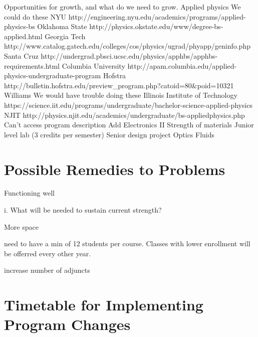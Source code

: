 \documentclass[12pt]{article}
\begin{document}
Opportunities for growth, and what do we need to grow.
Applied physics
We could do these
NYU http://engineering.nyu.edu/academics/programs/applied-physics-bs
Oklahoma State http://physics.okstate.edu/www/degree-bs-applied.html
Georgia Tech http://www.catalog.gatech.edu/colleges/cos/physics/ugrad/phyapp/geninfo.php
Santa Cruz http://undergrad.pbsci.ucsc.edu/physics/apphbs/apphbs-requirements.html
Columbia University http://apam.columbia.edu/applied-physics-undergraduate-program
Hofstra http://bulletin.hofstra.edu/preview_program.php?catoid=80&poid=10321
Williams 
We would have trouble doing these
Illinois Institute of Technology https://science.iit.edu/programs/undergraduate/bachelor-science-applied-physics
NJIT http://physics.njit.edu/academics/undergraduate/bs-appliedphysics.php
Can’t access program description
Add 
Electronics II
Strength of materials
Junior level lab (3 credits per semester)
Senior design project
Optics
Fluids

\section{Possible Remedies to Problems}
Functioning well

i. What will be needed to sustain current strength?

More space


need to have a min of 12 students per course.  Classes with lower enrollment will be offerred every other year.

increase number of adjuncts


\section{Timetable for Implementing Program Changes}
\end{document}
